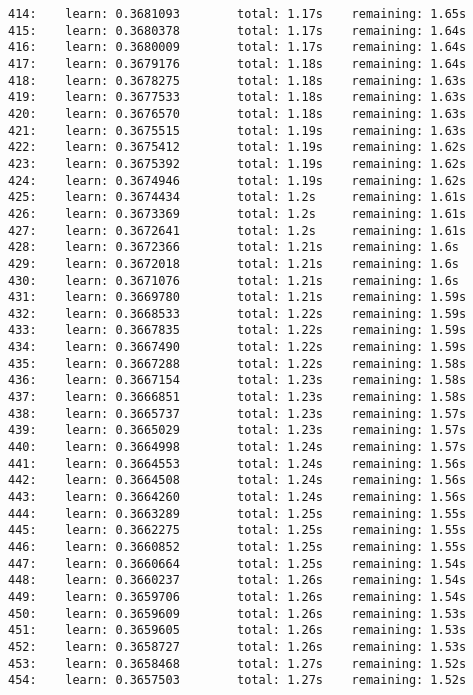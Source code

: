 \documentclass[11pt]{article}
\begin{document}
\begin{Verbatim}[commandchars=\\\{\}]
414:    learn: 0.3681093        total: 1.17s    remaining: 1.65s
415:    learn: 0.3680378        total: 1.17s    remaining: 1.64s
416:    learn: 0.3680009        total: 1.17s    remaining: 1.64s
417:    learn: 0.3679176        total: 1.18s    remaining: 1.64s
418:    learn: 0.3678275        total: 1.18s    remaining: 1.63s
419:    learn: 0.3677533        total: 1.18s    remaining: 1.63s
420:    learn: 0.3676570        total: 1.18s    remaining: 1.63s
421:    learn: 0.3675515        total: 1.19s    remaining: 1.63s
422:    learn: 0.3675412        total: 1.19s    remaining: 1.62s
423:    learn: 0.3675392        total: 1.19s    remaining: 1.62s
424:    learn: 0.3674946        total: 1.19s    remaining: 1.62s
425:    learn: 0.3674434        total: 1.2s     remaining: 1.61s
426:    learn: 0.3673369        total: 1.2s     remaining: 1.61s
427:    learn: 0.3672641        total: 1.2s     remaining: 1.61s
428:    learn: 0.3672366        total: 1.21s    remaining: 1.6s
429:    learn: 0.3672018        total: 1.21s    remaining: 1.6s
430:    learn: 0.3671076        total: 1.21s    remaining: 1.6s
431:    learn: 0.3669780        total: 1.21s    remaining: 1.59s
432:    learn: 0.3668533        total: 1.22s    remaining: 1.59s
433:    learn: 0.3667835        total: 1.22s    remaining: 1.59s
434:    learn: 0.3667490        total: 1.22s    remaining: 1.59s
435:    learn: 0.3667288        total: 1.22s    remaining: 1.58s
436:    learn: 0.3667154        total: 1.23s    remaining: 1.58s
437:    learn: 0.3666851        total: 1.23s    remaining: 1.58s
438:    learn: 0.3665737        total: 1.23s    remaining: 1.57s
439:    learn: 0.3665029        total: 1.23s    remaining: 1.57s
440:    learn: 0.3664998        total: 1.24s    remaining: 1.57s
441:    learn: 0.3664553        total: 1.24s    remaining: 1.56s
442:    learn: 0.3664508        total: 1.24s    remaining: 1.56s
443:    learn: 0.3664260        total: 1.24s    remaining: 1.56s
444:    learn: 0.3663289        total: 1.25s    remaining: 1.55s
445:    learn: 0.3662275        total: 1.25s    remaining: 1.55s
446:    learn: 0.3660852        total: 1.25s    remaining: 1.55s
447:    learn: 0.3660664        total: 1.25s    remaining: 1.54s
448:    learn: 0.3660237        total: 1.26s    remaining: 1.54s
449:    learn: 0.3659706        total: 1.26s    remaining: 1.54s
450:    learn: 0.3659609        total: 1.26s    remaining: 1.53s
451:    learn: 0.3659605        total: 1.26s    remaining: 1.53s
452:    learn: 0.3658727        total: 1.26s    remaining: 1.53s
453:    learn: 0.3658468        total: 1.27s    remaining: 1.52s
454:    learn: 0.3657503        total: 1.27s    remaining: 1.52s

\end{Verbatim}
\end{document}
